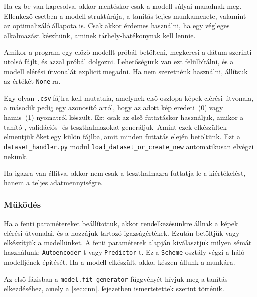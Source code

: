 
Ha ez be van kapcsolva, akkor mentéskor csak a modell súlyai maradnak meg. Ellenkező esetben
a modell struktúrája, a tanítás teljes munkamenete, valamint az optimalizáló állapota is.
Csak akkor érdemes használni, ha egy végleges alkalmazást készítünk, aminek tárhely-hatékonynak 
kell lennie.



Amikor a program egy előző modellt próbál betölteni, megkeresi a dátum szerinti utolsó
fájlt, és azzal próbál dolgozni. Lehetőségünk van ezt felülbírálni, és a modell elérési
útvonalát explicit megadni. Ha nem szeretnénk használni, állítsuk az értékét \texttt{None}-ra.



Egy olyan \texttt{.csv} fájlra kell mutatnia, amelynek első oszlopa képek elérési útvonala,
a második pedig egy azonosító arról, hogy az adott kép eredeti~(0) vagy hamis~(1) nyomatról készült.
Ezt csak az első futtatáskor használjuk, amikor a tanító-, validációs- és teszthalmazokat 
generáljuk. Amint ezek elkészültek elmentjük őket egy külön fájlba, amit minden futtatás elején
betöltünk. Ezt a \texttt{dataset\_handler.py} modul \texttt{load\_dataset\_or\_create\_new} 
automatikusan elvégzi nekünk.



Ha igazra van állítva, akkor nem csak a teszthalmazra futtatja le a kiértékelést, hanem 
a teljes adatmennyiségre. 


\subsubsection{Működés}

Ha a fenti paramétereket beállítottuk, akkor rendelkezésünkre állnak a képek elérési
útvonalai, és a hozzájuk tartozó igazságértékek. Ezután betöltjük vagy elkészítjük a 
modellünket. A fenti paraméterek alapján kiválasztjuk milyen sémát használunk: 
\texttt{Autoencoder}-t vagy \texttt{Predictor}-t. Ez a \texttt{Scheme} osztály végzi a háló
modelljének építését. Ha a modell elkészült, akkor készen állunk a munkára.


Az első fázisban a \texttt{model.fit\_generator} függvényét hívjuk meg
a tanítás elkezdéséhez, amely a \ref{sec:cnn}. fejezetben ismertetettek szerint történik.


